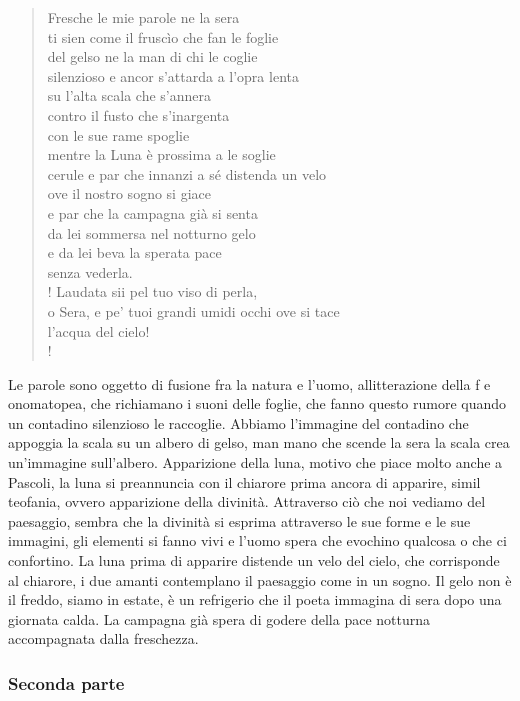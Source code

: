 \documentclass{book}
\begin{document}
\begin{verse}
Fresche le mie parole ne la sera\\
ti sien come il fruscìo che fan le foglie\\
del gelso ne la man di chi le coglie\\
silenzioso e ancor s’attarda a l’opra lenta\\
su l’alta scala che s’annera\\
contro il fusto che s’inargenta\\
con le sue rame spoglie\\
mentre la Luna è prossima a le soglie\\
cerule e par che innanzi a sé distenda un velo\\
ove il nostro sogno si giace\\
e par che la campagna già si senta\\
da lei sommersa nel notturno gelo\\
e da lei beva la sperata pace\\
senza vederla.\\!
Laudata sii pel tuo viso di perla,\\
o Sera, e pe’ tuoi grandi umidi occhi ove si tace\\
l’acqua del cielo!\\!
\end{verse}

Le parole sono oggetto di fusione fra la natura e l'uomo, allitterazione
della f e onomatopea, che richiamano i suoni delle foglie, che fanno
questo rumore quando un contadino silenzioso le raccoglie. Abbiamo
l'immagine del contadino che appoggia la scala su un albero di gelso,
man mano che scende la sera la scala crea un'immagine sull'albero.
Apparizione della luna, motivo che piace molto anche a Pascoli, la luna
si preannuncia con il chiarore prima ancora di apparire, simil teofania,
ovvero apparizione della divinità. Attraverso ciò che noi vediamo del
paesaggio, sembra che la divinità si esprima attraverso le sue forme e
le sue immagini, gli elementi si fanno vivi e l'uomo spera che evochino
qualcosa o che ci confortino. La luna prima di apparire distende un velo
del cielo, che corrisponde al chiarore, i due amanti contemplano il
paesaggio come in un sogno. Il gelo non è il freddo, siamo in estate, è
un refrigerio che il poeta immagina di sera dopo una giornata calda. La
campagna già spera di godere della pace notturna accompagnata dalla
freschezza.

\subsubsection{Seconda parte}
\end{document}
